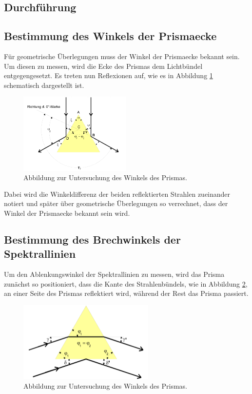 \subsection{Durchführung}
\label{sec:durchführung}
\subsection{Bestimmung des Winkels der Prismaecke}

Für geometrische Überlegungen muss der Winkel der Prismaecke bekannt sein.
Um diesen zu messen, wird die Ecke des Prismas dem Lichtbündel entgegengesetzt.
Es treten nun Reflexionen auf, wie es in Abbildung \ref{fig:2} schematisch dargestellt ist.

\begin{figure}[H]
  \centering
  \includegraphics[height=4cm]{ressources/aufbau2.png}
  \caption{Abbildung zur Untersuchung des Winkels des Prismas. \cite{skript}}
  \label{fig:2}
\end{figure}

Dabei wird die Winkeldifferenz der beiden reflektierten Strahlen zueinander notiert und später über geometrische Überlegungen so verrechnet, dass der Winkel der Prismaecke bekannt sein wird.

\subsection{Bestimmung des Brechwinkels der Spektrallinien}

Um den Ablenkungswinkel der Spektrallinien zu messen, wird das Prisma zunächst so positioniert, dass die Kante des Strahlenbündels, wie in Abbildung \ref{fig:3}, an einer Seite des Prismas reflektiert wird, während der Rest das Prisma passiert.

\begin{figure}[H]
  \centering
  \includegraphics[height=4cm]{ressources/aufbau3.png}
  \caption{Abbildung zur Untersuchung des Winkels des Prismas. \cite{skript}}
  \label{fig:3}
\end{figure}

